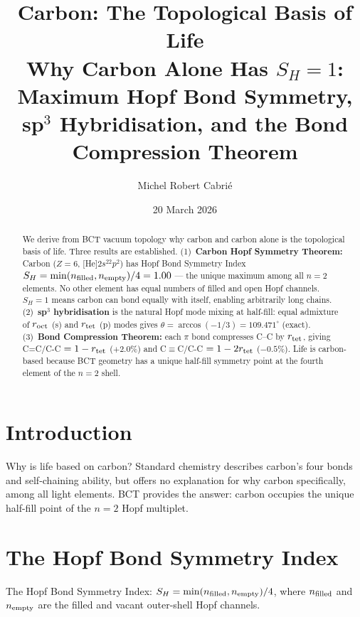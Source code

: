\documentclass[aps,prl,twocolumn,showpacs,superscriptaddress]{revtex4-2}
\begin{document}
\title{Carbon: The Topological Basis of Life\\
Why Carbon Alone Has $S_H = 1$: Maximum Hopf Bond Symmetry,
sp$^3$ Hybridisation, and the Bond Compression Theorem}

\author{Michel Robert Cabri\'e}
\date{20 March 2026}

\begin{abstract}
We derive from BCT vacuum topology why carbon and carbon alone is 
the topological basis of life. Three results are established.
(1)~\textbf{Carbon Hopf Symmetry Theorem:} Carbon ($Z=6$, 
[He]$2s^22p^2$) has Hopf Bond Symmetry Index $S_H = 
\min(n_{\rm filled}, n_{\rm empty})/4 = 1.00$ --- the unique 
maximum among all $n=2$ elements. No other element has equal 
numbers of filled and open Hopf channels. $S_H=1$ means carbon 
can bond equally with itself, enabling arbitrarily long chains.
(2)~\textbf{sp$^3$ hybridisation} is the natural Hopf mode 
mixing at half-fill: equal admixture of $r_{\rm oct}$ (s) and 
$r_{\rm tet}$ (p) modes gives $\theta = \arccos(-1/3) = 
109.471^\circ$ (exact).
(3)~\textbf{Bond Compression Theorem:} each $\pi$ bond compresses 
C--C by $r_{\rm tet}$, giving C=C/C-C $= 1-r_{\rm tet}$ ($+2.0\%$) 
and C$\equiv$C/C-C $= 1-2r_{\rm tet}$ ($-0.5\%$). Life is 
carbon-based because BCT geometry has a unique half-fill symmetry 
point at the fourth element of the $n=2$ shell.
\end{abstract}

\maketitle

\section{Introduction}

Why is life based on carbon? Standard chemistry describes carbon's 
four bonds and self-chaining ability, but offers no explanation for 
why carbon specifically, among all light elements. BCT provides the 
answer: carbon occupies the unique half-fill point of the $n=2$ 
Hopf multiplet.

\section{The Hopf Bond Symmetry Index}

\begin{definition}
The Hopf Bond Symmetry Index: $S_H = \min(n_{\rm filled}, 
n_{\rm empty})/4$, where $n_{\rm filled}$ and $n_{\rm empty}$ are 
the filled and vacant outer-shell Hopf channels.
\end{definition}
\end{document}
